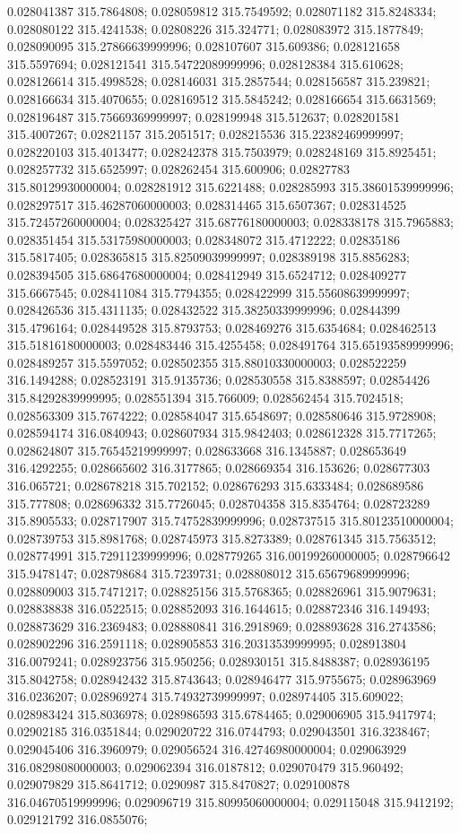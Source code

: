0.028041387 315.7864808; 0.028059812 315.7549592; 0.028071182 315.8248334; 0.028080122 315.4241538; 0.02808226 315.324771; 0.028083972 315.1877849; 0.028090095 315.27866639999996; 0.028107607 315.609386; 0.028121658 315.5597694; 0.028121541 315.54722089999996; 0.028128384 315.610628; 0.028126614 315.4998528; 0.028146031 315.2857544; 0.028156587 315.239821; 0.028166634 315.4070655; 0.028169512 315.5845242; 0.028166654 315.6631569; 0.028196487 315.75669369999997; 0.028199948 315.512637; 0.028201581 315.4007267; 0.02821157 315.2051517; 0.028215536 315.22382469999997; 0.028220103 315.4013477; 0.028242378 315.7503979; 0.028248169 315.8925451; 0.028257732 315.6525997; 0.028262454 315.600906; 0.02827783 315.80129930000004; 0.028281912 315.6221488; 0.028285993 315.38601539999996; 0.028297517 315.46287060000003; 0.028314465 315.6507367; 0.028314525 315.72457260000004; 0.028325427 315.68776180000003; 0.028338178 315.7965883; 0.028351454 315.53175980000003; 0.028348072 315.4712222; 0.02835186 315.5817405; 0.028365815 315.82509039999997; 0.028389198 315.8856283; 0.028394505 315.68647680000004; 0.028412949 315.6524712; 0.028409277 315.6667545; 0.028411084 315.7794355; 0.028422999 315.55608639999997; 0.028426536 315.4311135; 0.028432522 315.38250339999996; 0.02844399 315.4796164; 0.028449528 315.8793753; 0.028469276 315.6354684; 0.028462513 315.51816180000003; 0.028483446 315.4255458; 0.028491764 315.65193589999996; 0.028489257 315.5597052; 0.028502355 315.88010330000003; 0.028522259 316.1494288; 0.028523191 315.9135736; 0.028530558 315.8388597; 0.02854426 315.84292839999995; 0.028551394 315.766009; 0.028562454 315.7024518; 0.028563309 315.7674222; 0.028584047 315.6548697; 0.028580646 315.9728908; 0.028594174 316.0840943; 0.028607934 315.9842403; 0.028612328 315.7717265; 0.028624807 315.76545219999997; 0.028633668 316.1345887; 0.028653649 316.4292255; 0.028665602 316.3177865; 0.028669354 316.153626; 0.028677303 316.065721; 0.028678218 315.702152; 0.028676293 315.6333484; 0.028689586 315.777808; 0.028696332 315.7726045; 0.028704358 315.8354764; 0.028723289 315.8905533; 0.028717907 315.74752839999996; 0.028737515 315.80123510000004; 0.028739753 315.8981768; 0.028745973 315.8273389; 0.028761345 315.7563512; 0.028774991 315.72911239999996; 0.028779265 316.00199260000005; 0.028796642 315.9478147; 0.028798684 315.7239731; 0.028808012 315.65679689999996; 0.028809003 315.7471217; 0.028825156 315.5768365; 0.028826961 315.9079631; 0.028838838 316.0522515; 0.028852093 316.1644615; 0.028872346 316.149493; 0.028873629 316.2369483; 0.028880841 316.2918969; 0.028893628 316.2743586; 0.028902296 316.2591118; 0.028905853 316.20313539999995; 0.028913804 316.0079241; 0.028923756 315.950256; 0.028930151 315.8488387; 0.028936195 315.8042758; 0.028942432 315.8743643; 0.028946477 315.9755675; 0.028963969 316.0236207; 0.028969274 315.74932739999997; 0.028974405 315.609022; 0.028983424 315.8036978; 0.028986593 315.6784465; 0.029006905 315.9417974; 0.02902185 316.0351844; 0.029020722 316.0744793; 0.029043501 316.3238467; 0.029045406 316.3960979; 0.029056524 316.42746980000004; 0.029063929 316.08298080000003; 0.029062394 316.0187812; 0.029070479 315.960492; 0.029079829 315.8641712; 0.0290987 315.8470827; 0.029100878 316.04670519999996; 0.029096719 315.80995060000004; 0.029115048 315.9412192; 0.029121792 316.0855076; 